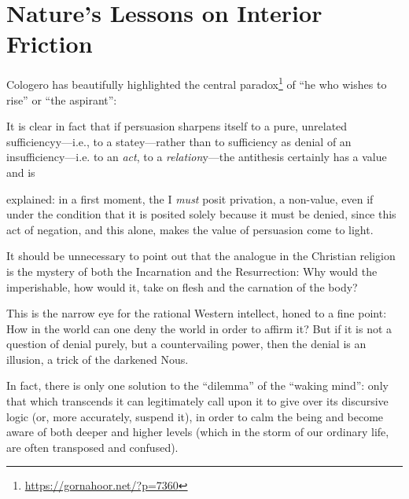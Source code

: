 \section{Nature’s Lessons on Interior Friction}

Cologero has beautifully highlighted the central paradox\footnote{\url{https://gornahoor.net/?p=7360}} of ``he who wishes to rise'' or ``the aspirant'':

\begin{quotex}
It is clear in fact that if persuasion sharpens itself to a pure, unrelated sufficiencyy---i.e., to a statey---rather than to sufficiency as denial of an insufficiency---i.e. to an \emph{act}, to a
\emph{relation}y---the antithesis certainly has a value and is

explained: in a first moment, the I \emph{must} posit privation, a non-value, even if under the condition that it is posited solely because it must be denied, since this act of negation, and this alone, makes the value of persuasion come to light.
\end{quotex}


It should be unnecessary to point out that the analogue in the Christian religion is the mystery of both the Incarnation and the Resurrection: Why would the imperishable, how would it, take on flesh and the carnation of the body?

This is the narrow eye for the rational Western intellect, honed to a fine point: How in the world can one deny the world in order to affirm it? But if it is not a question of denial purely, but a countervailing power, then the denial is an illusion, a trick of the darkened Nous.

In fact, there is only one solution to the ``dilemma'' of the ``waking mind'': only that which transcends it can legitimately call upon it to give over its discursive logic (or, more accurately, suspend it), in order to calm the being and become aware of both deeper and higher levels (which in the storm of our ordinary life, are often transposed and confused).


